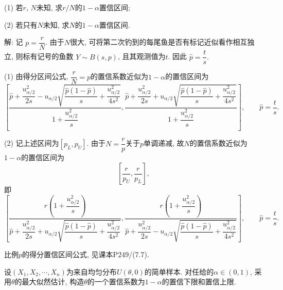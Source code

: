 \documentclass[standard]{ExBook}
\renewenvironment{shaded}{%
  \def\FrameCommand{\fboxsep=\FrameSep \colorbox{shadecolor}}%
  \MakeFramed{\advance\hsize-\width \FrameRestore}%
}{%
  \endMakeFramed
}
\begin{document}
\begin{qitems}
\begin{bbox}
\begin{shaded}
(1) 若$r$, $N$未知, 求$r/N$的$1-\alpha$置信区间;

(2) 若只有$N$未知, 求$N$的$1 - \alpha$置信区间.
    \end{shaded}
    \end{bbox}

\vspace{\dimexpr2.5cm-5em\relax}

解: 记
$
p=\dfrac{r}{N}
$.
由于$N$很大, 可将第二次钓到的每尾鱼是否有标记近似看作相互独立, 则标有记号的鱼数
$
Y\sim B(s,p)
$,
且其观测值为$t$. 因此
$
\widehat{p}=\dfrac{t}{s}.
$

(1) 由得分区间公式, $\dfrac{r}{N}=p$的置信系数近似为$1-\alpha$的置信区间为
$$
\left[
\frac{\widehat{p}+\dfrac{u_{\alpha/2}^2}{2s}
-u_{\alpha/2}\sqrt{\dfrac{\widehat{p}(1-\widehat{p})}{s}
+\dfrac{u_{\alpha/2}^2}{4s^2}}}
{1+\dfrac{u_{\alpha/2}^2}{s}},
\frac{\widehat{p}+\dfrac{u_{\alpha/2}^2}{2s}
+u_{\alpha/2}\sqrt{\dfrac{\widehat{p}(1-\widehat{p})}{s}
+\dfrac{u_{\alpha/2}^2}{4s^2}}}
{1+\dfrac{u_{\alpha/2}^2}{s}}
\right],
\qquad
\widehat{p}=\frac{t}{s}.
$$

(2) 记上述区间为$[p_L,p_U]$. 由于$N=\dfrac{r}{p}$关于$p$单调递减, 故$N$的置信系数近似为$1-\alpha$的置信区间为
$$
\left[
\frac{r}{p_U},
\frac{r}{p_L}
\right],
$$
即
$$
\left[
\frac{r\left(1+\dfrac{u_{\alpha/2}^2}{s}\right)}
{\widehat{p}+\dfrac{u_{\alpha/2}^2}{2s}
+u_{\alpha/2}\sqrt{\dfrac{\widehat{p}(1-\widehat{p})}{s}
+\dfrac{u_{\alpha/2}^2}{4s^2}}},
\frac{r\left(1+\dfrac{u_{\alpha/2}^2}{s}\right)}
{\widehat{p}+\dfrac{u_{\alpha/2}^2}{2s}
-u_{\alpha/2}\sqrt{\dfrac{\widehat{p}(1-\widehat{p})}{s}
+\dfrac{u_{\alpha/2}^2}{4s^2}}}
\right],
\qquad
\widehat{p}=\frac{t}{s}.
$$

\textcolor{themeColor}{\selectfont {}
比例$p$的得分置信区间公式, 见课本P249/(7.7).}

\vspace{2.5cm-5em}

    \begin{bbox}
    \begin{shaded}
        \qitem
设$(X_1,X_2,\cdots,X_n)$为来自均匀分布$U(\theta,0)$的简单样本. 对任给的$\alpha \in (0,1)$, 采用$\theta$的最大似然估计, 构造$\theta$的一个置信系数为$1-\alpha$的置信下限和置信上限.
    \end{shaded}
    \end{bbox}

\vspace{\dimexpr2.5cm-5em\relax}


\end{qitems}
\end{document}
